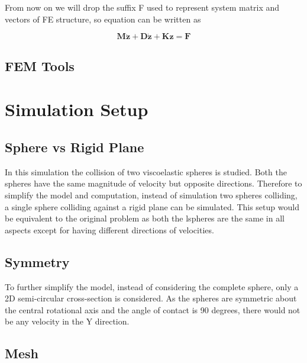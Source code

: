 From now on we will drop the suffix F used to represent system matrix
and vectors of FE structure, so equation can be written as 

\begin{equation}
\mathbf{M}\ddot{\mathbf{\boldsymbol{z}}}+\mathbf{D}\mathbf{\dot{z}}+\mathbf{K}\mathbf{z}=\mathbf{F}\label{final equtation of motion FE}
\end{equation}










\subsection{FEM Tools}



\section{Simulation Setup}
\subsection{Sphere vs Rigid Plane}
In this simulation the collision of two viscoelastic spheres is studied. Both the spheres have the same magnitude of velocity but opposite directions. Therefore to simplify the model and computation, instead of simulation two spheres colliding, a single sphere colliding against a rigid plane can be simulated. This setup would be equivalent to the original problem as both the lspheres are the same in all aspects except for having different directions of velocities.

\subsection{Symmetry}
To further simplify the model, instead of considering the complete sphere, only a 2D semi-circular cross-section is considered. As the spheres are symmetric about the central rotational axis and the angle of contact is 90 degrees, there would not be any velocity in the Y direction. 

\subsection{Mesh}

